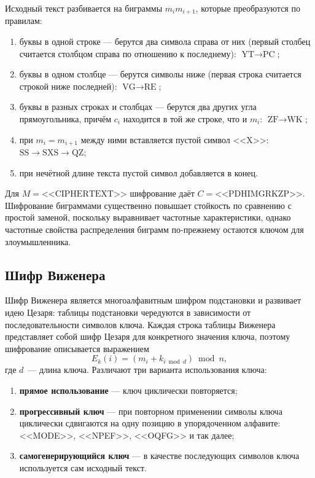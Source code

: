 \documentclass[14pt,a4paper]{extarticle}
\begin{document}
Исходный текст разбивается на биграммы $m_i m_{i+1}$, которые преобразуются по
правилам:
\begin{enumerate}
\item буквы в одной строке --- берутся два символа справа от них (первый столбец
считается столбцом справа по отношению к последнему): $\text{YT} \to \text{PC}$;
\item буквы в одном столбце --- берутся символы ниже (первая строка считается строкой
ниже последней): $\text{VG} \to \text{RE}$;
\item буквы в разных строках и столбцах --- берутся два других угла прямоугольника,
причём $c_i$ находится в той же строке, что и $m_i$: $\text{ZF} \to \text{WK}$;
\item при $m_i = m_{i+1}$ между ними вставляется пустой символ <<X>>:
$\text{SS} \to \text{SXS} \to \text{QZ}$;
\item при нечётной длине текста пустой символ добавляется в конец.
\end{enumerate}

Для $M = \text{<<CIPHERTEXT>>}$ шифрование даёт $C = \text{<<PDHIMGRKZP>>}$.
Шифрование биграммами существенно повышает стойкость по сравнению с простой заменой,
поскольку выравнивает частотные характеристики, однако частотные свойства
распределения биграмм по-прежнему остаются ключом для злоумышленника.

\subsection{Шифр Виженера}

Шифр Виженера является многоалфавитным шифром подстановки и развивает идею Цезаря:
таблицы подстановки чередуются в зависимости от последовательности символов ключа.
Каждая строка таблицы Виженера представляет собой шифр Цезаря для конкретного
значения ключа, поэтому шифрование описывается выражением
\begin{equation}
E_k(i) = (m_i + k_{i \bmod d}) \bmod n,
\end{equation}
где $d$~--- длина ключа. Различают три варианта использования ключа:
\begin{enumerate}
\item \textbf{прямое использование} --- ключ циклически повторяется;
\item \textbf{прогрессивный ключ} --- при повторном применении символы ключа
циклически сдвигаются на одну позицию в упорядоченном алфавите: <<MODE>>,
<<NPEF>>, <<OQFG>> и так далее;
\item \textbf{самогенерирующийся ключ} --- в качестве последующих символов ключа
используется сам исходный текст.
\end{enumerate}
\end{document}
